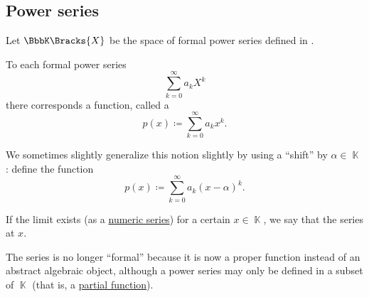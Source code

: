 \subsection{Power series}\label{subsec:power_series}

\begin{definition}\label{def:convergent_power_series}
  Let \( \BbbK\Bracks{X} \) be the space of formal power series defined in .

  To each formal power series
  \begin{equation*}
    \sum_{k=0}^\infty a_k X^k
  \end{equation*}
  there corresponds a function, called a 
  \begin{equation}\label{def:convergent_power_series/series}
    p(x) \coloneqq \sum_{k=0}^\infty a_k x^k.
  \end{equation}

  We sometimes slightly generalize this notion slightly by using a \enquote{shift} by \( \alpha \in \BbbK \): define the function
  \begin{equation}\label{def:convergent_power_series/shifted_series}
    p(x) \coloneqq \sum_{k=0}^\infty a_k (x - \alpha)^k.
  \end{equation}

  If the limit exists (as a \hyperref[def:convergent_series]{numeric series}) for a certain \( x \in \BbbK \), we say that the series  at \( x \).

  The series is no longer \enquote{formal} because it is now a proper function instead of an abstract algebraic object, although a power series may only be defined in a subset of \( \BbbK \) (that is, a \hyperref[def:set_valued_map/partial]{partial function}).
\end{definition}

